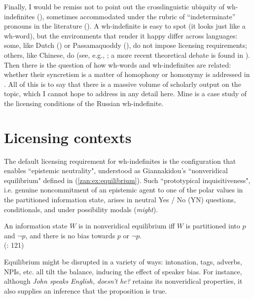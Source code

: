 \documentclass[output=paper,colorlinks,citecolor=brown]{langscibook}
\begin{document}
\noindent Finally, I would be remiss not to point out the crosslinguistic ubiquity of wh-indefinites (\citealt{Gartner2009}), sometimes accommodated under the rubric of ``indeterminate'' pronouns in the literature (\citealt{kratzer2017indeterminate}). A wh-inde\-finite is easy to spot (it looks just like a wh-word), but the environments that render it happy differ across languages: some, like Dutch (\citealt{postma1994indefinite}) or Passamaquoddy (\citealt{bruening2007wh}), do not impose licensing requirements; others, like Chinese, do (see, e.g., \citealt{bruening2007wh, lin2014wh}; a more recent theoretical debate is found in \citealt{chierchia2015, giannakidou2016mandarin, liu2021modal}). Then there is the question of how wh-words and wh-indefinites are related: whether their syncretism is a matter of homophony or homonymy is addressed in \citet{bhat2004pronouns}. All of this is to say that there is a massive volume of scholarly output on the topic, which I cannot hope to address in any detail here. Mine is a case study of the licensing conditions of the Russian wh-indefinite.


\section{Licensing contexts}\label{zan:sec:licensing contexts}
The default licensing requirement for wh-indefinites is the configuration that enables ``epistemic neutrality", understood as Giannakidou's ``nonveridical equilibrium" defined in (\ref{zan:ex:equilibrium}). Such ``prototypical inquisitiveness", i.e. genuine noncommitment of an epistemic agent to one of the polar values in the partitioned information state, arises in neutral Yes / No (YN) questions, conditionals, and under possibility modals (\textit{might}). 

\ea \label{zan:ex:equilibrium}
An information state $W$ is in nonveridical equilibrium iff $W$ is partitioned into $p$ and $\neg p$, and there is no bias towards $p$ or $\neg p$. \\\hfill(\citealt{giannakidou2013inquisitive}: 121)
\z

\noindent Equilibrium might be disrupted in a variety of ways: intonation, tags, adverbs, NPIs, etc. all tilt the balance, inducing the effect of speaker bias. For instance, although \textit{John speaks English, doesn't he?} retains its nonveridical properties, it also supplies an inference that the proposition is true.  
\end{document}

